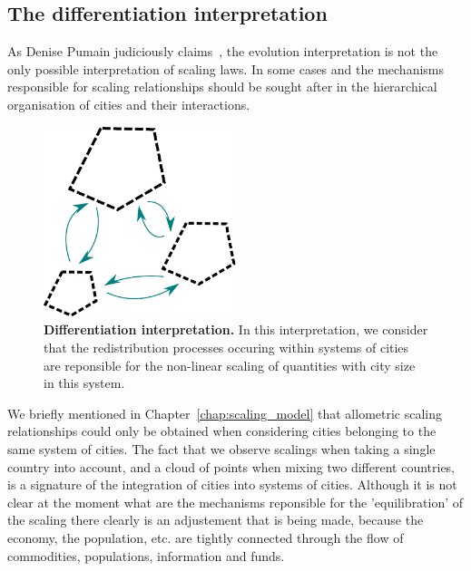\subsection{The differentiation interpretation}
\label{sub:the_differentiation_interpretation}

As Denise Pumain judiciously claims~\cite{Pumain:2006,Pumain:2012}, the evolution
interpretation is not the only possible interpretation of scaling laws. In some
cases and the mechanisms responsible for scaling relationships should be sought
after in the hierarchical organisation of cities and their interactions.\\

\begin{figure}[!h]
    \centering
    \includegraphics[width=0.5\textwidth]{gfx/chapter-scaling/system-interpretation.pdf}
    \caption{{\bf Differentiation interpretation.} In this interpretation, we
    consider that the redistribution processes occuring within systems of cities
are reponsible for the non-linear scaling of quantities with city size in this
system.\label{fig:label_fig}}
\end{figure}

We briefly mentioned in Chapter~\ref{chap:scaling_model} that allometric scaling relationships
could only be obtained when considering cities belonging to the same system of
cities. The fact that we observe scalings when taking a single country into
account, and a cloud of points when mixing two different countries, is a
signature of the integration of cities into systems of cities. Although it is
not clear at the moment what are the mechanisms reponsible for the
'equilibration' of the scaling there clearly is an adjustement that is being
made, because the economy, the population, etc. are tightly connected through
the flow of commodities, populations, information and funds.\\

